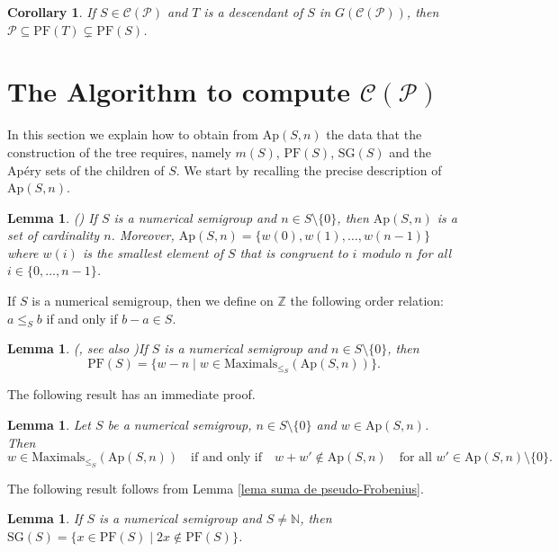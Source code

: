 \documentclass[11pt]{article}
\def\N{\mathbb{N}}
\newtheorem{corollary}[theorem]{Corollary}
\newtheorem{lemma}[theorem]{Lemma}
\numberwithin{equation}{section}
\newcommand{\CP}{\mathcal C(\mathcal P)}
\newcommand{\Ap}{\mathrm{Ap}}
\newcommand{\PF}{\mathrm{PF}}
\newcommand{\SG}{\mathrm{SG}}
\begin{document}
\begin{corollary}\label{corolario PF cadena}
If $S\in\CP$ and $T$ is a descendant of $S$ in $G(\CP)$, then $\mathcal P\subseteq\PF(T)\subsetneq\PF(S)$.
\end{corollary}

\section{The Algorithm to compute \texorpdfstring{$\mathcal C(\mathcal P)$}{C(P)}}\label{sec:algorithm}

In this section we explain how to obtain from $\Ap(S,n)$ the data that the construction of the tree requires, namely $m(S)$, $\PF(S)$, $\SG(S)$ and the Ap\'ery sets of the children of $S$. We start by recalling the precise description of $\Ap(S,n)$.

\begin{lemma}(\cite[Lemma 2.4]{libro})
    If $S$ is a numerical semigroup and $n\in S\setminus\{0\}$, then $\Ap(S,n)$ is a set of cardinality $n$. Moreover, $\mathrm{Ap}(S,n)=\{w(0),w(1),\ldots,w(n-1)\}$ where $w(i)$ is the smallest element of $S$ that is congruent to $i$ modulo $n$ for all $i\in\{0,\ldots,n-1\}$.
\end{lemma}

If $S$ is a numerical semigroup, then we define on $\mathbb Z$ the following order relation: $a\leq_S b$ if and only if $b-a\in S$.

\begin{lemma}(\cite[Lemma 10]{JPAA}, see also \cite[Proposition 2.20]{libro})\label{lema pseudo-Frobenius y maximales}
    If $S$ is a numerical semigroup and $n\in S\setminus\{0\}$, then $$\mathrm{PF}(S)=\{w-n \mid w\in\mathrm{Maximals}_{\leq_S}(\mathrm{Ap}(S,n))\}.$$
\end{lemma}

The following result has an immediate proof.

\begin{lemma}\label{lema apery con apery}
    Let $S$ be a numerical semigroup, $n\in S\setminus\{0\}$ and $w\in\mathrm{Ap}(S,n)$. Then
    \[
    w\in\mathrm{Maximals}_{\leq_S}(\mathrm{Ap}(S,n)) \quad\text{if and only if}\quad
    w+w'\notin \mathrm{Ap}(S,n)\quad\text{for all } w'\in\mathrm{Ap}(S,n)\setminus\{0\}.
    \]
\end{lemma}

The following result follows from Lemma \ref{lema suma de pseudo-Frobenius}.

\begin{lemma}\label{lema huecos especiales}
    If $S$ is a numerical semigroup and $S\ne\N$, then $\mathrm{SG}(S)=\{x\in\mathrm{PF}(S)\mid 2x\notin \mathrm{PF}(S)\}$.
\end{lemma}
\end{document}
